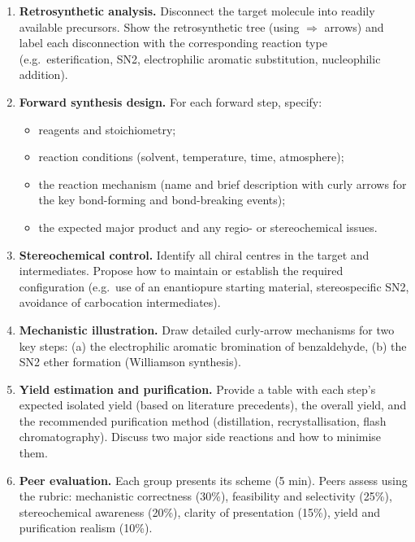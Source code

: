 \documentclass[11pt]{article}
\newcommand{\cle}[1]{{\popxbold\color{popdark}#1}}
\newcounter{popsec}
\newcounter{popsub}
\newcommand{\courssub}[1]{%
  \stepcounter{popsub}%
  \par\vspace{9pt}\noindent{\popxbold\fontsize{11.5}{13}\selectfont\color{popink}{\color{poporange}\thepopsec.\thepopsub}\hspace{6pt}#1}\par\nopagebreak\vspace{4pt}
}
\begin{document}
\courssub{Tasks}
\begin{enumerate}
    \item \textbf{Retrosynthetic analysis.} Disconnect the target molecule into readily available precursors. Show the retrosynthetic tree (using $\Rightarrow$ arrows) and label each disconnection with the corresponding reaction type (e.g.\ \cle{esterification}, \cle{SN2}, \cle{electrophilic aromatic substitution}, \cle{nucleophilic addition}).
    \item \textbf{Forward synthesis design.} For each forward step, specify:
          \begin{itemize}
              \item reagents and stoichiometry;
              \item reaction conditions (solvent, temperature, time, atmosphere);
              \item the reaction mechanism (name and brief description with curly arrows for the key bond-forming and bond-breaking events);
              \item the expected major product and any regio- or stereochemical issues.
          \end{itemize}
    \item \textbf{Stereochemical control.} Identify all chiral centres in the target and intermediates. Propose how to maintain or establish the required configuration (e.g.\ use of an enantiopure starting material, stereospecific \cle{SN2}, avoidance of carbocation intermediates).
    \item \textbf{Mechanistic illustration.} Draw detailed curly-arrow mechanisms for two key steps: (a) the electrophilic aromatic bromination of benzaldehyde, (b) the \cle{SN2} ether formation (Williamson synthesis).
    \item \textbf{Yield estimation and purification.} Provide a table with each step's expected isolated yield (based on literature precedents), the overall yield, and the recommended purification method (distillation, recrystallisation, flash chromatography). Discuss two major side reactions and how to minimise them.
    \item \textbf{Peer evaluation.} Each group presents its scheme (5 min). Peers assess using the rubric: mechanistic correctness (30\%), feasibility and selectivity (25\%), stereochemical awareness (20\%), clarity of presentation (15\%), yield and purification realism (10\%).
\end{enumerate}

\courssub{Model answer}
\end{document}
